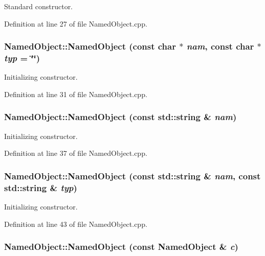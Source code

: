 Standard constructor. 

Definition at line 27 of file NamedObject.cpp.\hypertarget{class_d_d4hep_1_1_named_object_a8d1a329816f1cd08f79dc3fd34bd705a}{
\subsubsection[{NamedObject}]{\setlength{\rightskip}{0pt plus 5cm}NamedObject::NamedObject (const char $\ast$ {\em nam}, \/  const char $\ast$ {\em typ} = {\ttfamily \char`\"{}\char`\"{}})}}
\label{class_d_d4hep_1_1_named_object_a8d1a329816f1cd08f79dc3fd34bd705a}


Initializing constructor. 

Definition at line 31 of file NamedObject.cpp.\hypertarget{class_d_d4hep_1_1_named_object_a5d287da6b18dfb39eda2bbac78dabfb3}{
\subsubsection[{NamedObject}]{\setlength{\rightskip}{0pt plus 5cm}NamedObject::NamedObject (const std::string \& {\em nam})}}
\label{class_d_d4hep_1_1_named_object_a5d287da6b18dfb39eda2bbac78dabfb3}


Initializing constructor. 

Definition at line 37 of file NamedObject.cpp.\hypertarget{class_d_d4hep_1_1_named_object_ade52cf9617e164e408df2ca3bc2f90f5}{
\subsubsection[{NamedObject}]{\setlength{\rightskip}{0pt plus 5cm}NamedObject::NamedObject (const std::string \& {\em nam}, \/  const std::string \& {\em typ})}}
\label{class_d_d4hep_1_1_named_object_ade52cf9617e164e408df2ca3bc2f90f5}


Initializing constructor. 

Definition at line 43 of file NamedObject.cpp.\hypertarget{class_d_d4hep_1_1_named_object_acf040390da871e998768cf0a9ea6fc98}{
\subsubsection[{NamedObject}]{\setlength{\rightskip}{0pt plus 5cm}NamedObject::NamedObject (const {\bf NamedObject} \& {\em c})}}
\label{class_d_d4hep_1_1_named_object_acf040390da871e998768cf0a9ea6fc98}


